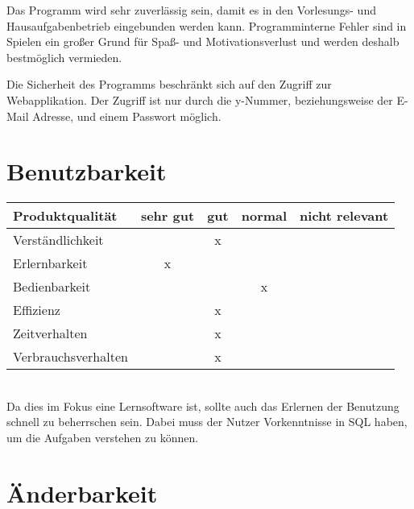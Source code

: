 Das Programm wird sehr zuverlässig sein, damit es in den Vorlesungs- und Hausaufgabenbetrieb eingebunden werden kann.  
Programminterne Fehler sind in Spielen ein großer Grund für Spaß- und Motivationsverlust und werden deshalb bestmöglich vermieden.

Die Sicherheit des Programms beschränkt sich auf den Zugriff zur Webapplikation. Der Zugriff ist nur durch die y-Nummer, beziehungsweise der 
E-Mail Adresse, und einem Passwort m\"oglich. 


\section{Benutzbarkeit}

\begin{tabular}{|l|c|c|c|c|}
	\hline
	\textbf{Produktqualität} & \textbf{sehr gut} & \textbf{gut} & \textbf{normal} & \textbf{nicht relevant} \\ \hline
	Verständlichkeit         &                   &      x       &                 &                         \\ 
	\hline
	Erlernbarkeit            &          x         &              &                &                         \\ 
	\hline
	Bedienbarkeit            &                   &             &       x          &                         \\ 
	\hline
	Effizienz                &                   &       x       &                 &                         \\ 
	\hline
	Zeitverhalten            &                   &      x       &                 &                         \\ 
	\hline
	Verbrauchsverhalten      &                   &      x       &                 &                         \\ 
	\hline
\end{tabular}\\

Da dies im Fokus eine Lernsoftware ist, sollte auch das Erlernen der Benutzung schnell zu beherrschen sein. 
Dabei muss der Nutzer Vorkenntnisse in SQL haben, um die Aufgaben verstehen zu können.


\section{Änderbarkeit}

